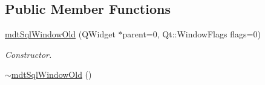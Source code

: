 \subsection*{Public Member Functions}
\begin{DoxyCompactItemize}
\item 
\hyperlink{classmdt_sql_window_old_a9170407405ec35a04db91de7d0e7ba25}{mdtSqlWindowOld} (QWidget $\ast$parent=0, Qt::WindowFlags flags=0)
\begin{DoxyCompactList}\small\item\em Constructor. \end{DoxyCompactList}\item 
\hypertarget{classmdt_sql_window_old_ab83d51a38de33e200d40d1e25c870529}{
\hyperlink{classmdt_sql_window_old_ab83d51a38de33e200d40d1e25c870529}{$\sim$mdtSqlWindowOld} ()}
\label{classmdt_sql_window_old_ab83d51a38de33e200d40d1e25c870529}


\end{DoxyCompactItemize}

